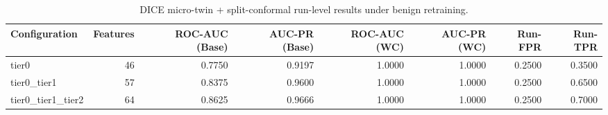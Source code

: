 \begin{table}[t]
\centering
\caption{DICE micro-twin + split-conformal run-level results under benign retraining.}
\label{tab:dice_full_overall}
\footnotesize
\begin{tabular}{lrrrrrrr}
\toprule
Configuration & Features & ROC-AUC (Base) & AUC-PR (Base) & ROC-AUC (WC) & AUC-PR (WC) & Run-FPR & Run-TPR \\
\midrule
tier0 & 46 & 0.7750 & 0.9197 & 1.0000 & 1.0000 & 0.2500 & 0.3500 \\
tier0_tier1 & 57 & 0.8375 & 0.9600 & 1.0000 & 1.0000 & 0.2500 & 0.6500 \\
tier0_tier1_tier2 & 64 & 0.8625 & 0.9666 & 1.0000 & 1.0000 & 0.2500 & 0.7000 \\
\bottomrule
\end{tabular}

\end{table}
